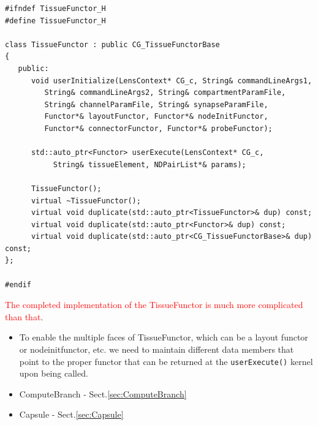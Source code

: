 {\tiny
\begin{verbatim}
#ifndef TissueFunctor_H
#define TissueFunctor_H

class TissueFunctor : public CG_TissueFunctorBase
{
   public:
      void userInitialize(LensContext* CG_c, String& commandLineArgs1, 
         String& commandLineArgs2, String& compartmentParamFile, 
         String& channelParamFile, String& synapseParamFile, 
         Functor*& layoutFunctor, Functor*& nodeInitFunctor, 
         Functor*& connectorFunctor, Functor*& probeFunctor);
      
      std::auto_ptr<Functor> userExecute(LensContext* CG_c, 
           String& tissueElement, NDPairList*& params);
           
      TissueFunctor();
      virtual ~TissueFunctor();
      virtual void duplicate(std::auto_ptr<TissueFunctor>& dup) const;
      virtual void duplicate(std::auto_ptr<Functor>& dup) const;
      virtual void duplicate(std::auto_ptr<CG_TissueFunctorBase>& dup) const;
};

#endif
\end{verbatim}
}

\textcolor{red}{The completed implementation of the TissueFunctor is much more
complicated than that}.

\begin{itemize}
  
  \item To enable the multiple faces of TissueFunctor, which can be a layout
  functor or nodeinitfunctor, etc. we need to maintain different data members
  that point to the proper functor that can be returned at the
  \verb!userExecute()! kernel upon being called.
  
  
  \item ComputeBranch - Sect.\ref{sec:ComputeBranch}
  
  \item Capsule - Sect.\ref{sec:Capsule}
\end{itemize}

